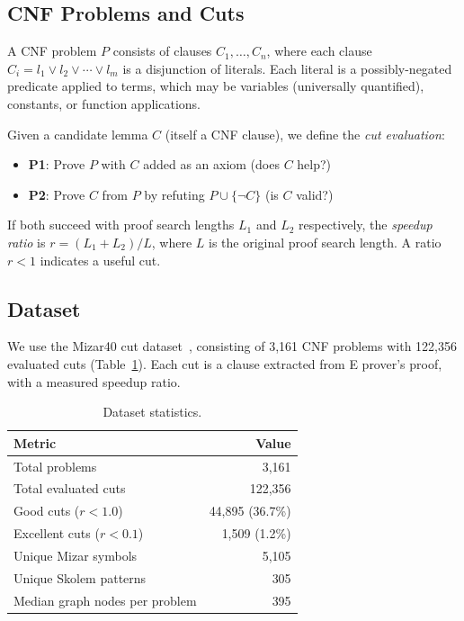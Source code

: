 \documentclass{article}
\begin{document}
\subsection{CNF Problems and Cuts}

A CNF problem $P$ consists of clauses $C_1, \ldots, C_n$, where each clause
$C_i = l_1 \lor l_2 \lor \cdots \lor l_m$ is a disjunction of literals. Each literal
is a possibly-negated predicate applied to terms, which may be variables (universally
quantified), constants, or function applications.

Given a candidate lemma $C$ (itself a CNF clause), we define the \emph{cut evaluation}:
\begin{itemize}
\item \textbf{P1}: Prove $P$ with $C$ added as an axiom (does $C$ help?)
\item \textbf{P2}: Prove $C$ from $P$ by refuting $P \cup \{\neg C\}$ (is $C$ valid?)
\end{itemize}

If both succeed with proof search lengths $L_1$ and $L_2$ respectively, the
\emph{speedup ratio} is $r = (L_1 + L_2) / L$, where $L$ is the original proof
search length. A ratio $r < 1$ indicates a useful cut.

\subsection{Dataset}

We use the Mizar40 cut dataset~\cite{kaliszyk2015mizar40}, consisting of 3,161 CNF
problems with 122,356 evaluated cuts (Table~\ref{tab:dataset}). Each cut is a clause
extracted from E prover's proof, with a measured speedup ratio.

\begin{table}[t]
\centering
\caption{Dataset statistics.}
\label{tab:dataset}
\begin{tabular}{lr}
\toprule
\textbf{Metric} & \textbf{Value} \\
\midrule
Total problems & 3,161 \\
Total evaluated cuts & 122,356 \\
Good cuts ($r < 1.0$) & 44,895 (36.7\%) \\
Excellent cuts ($r < 0.1$) & 1,509 (1.2\%) \\
Unique Mizar symbols & 5,105 \\
Unique Skolem patterns & 305 \\
Median graph nodes per problem & 395 \\
\bottomrule
\end{tabular}
\end{table}
\end{document}

